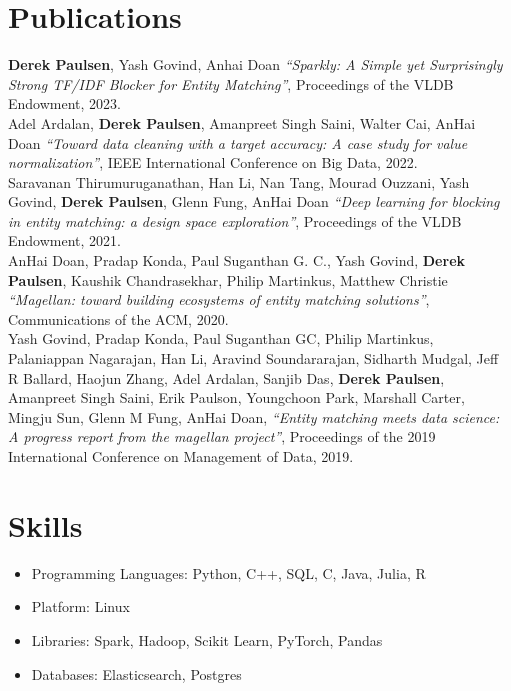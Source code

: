 \documentclass{resume}
\begin{document}
\section{\textbf{Publications}}

\textbf{Derek Paulsen}, Yash Govind, Anhai Doan
\textit{``Sparkly: A Simple yet Surprisingly Strong TF/IDF Blocker for Entity Matching''},
Proceedings of the VLDB Endowment, 2023.\\

Adel Ardalan, \textbf{Derek Paulsen}, Amanpreet Singh Saini, Walter Cai, AnHai Doan
\textit{``Toward data cleaning with a target accuracy: A case study for value normalization''},
IEEE International Conference on Big Data, 2022.\\

Saravanan Thirumuruganathan, Han Li, Nan Tang, Mourad Ouzzani, Yash Govind, \textbf{Derek Paulsen}, Glenn Fung, AnHai Doan
\textit{``Deep learning for blocking in entity matching: a design space exploration''},
Proceedings of the VLDB Endowment, 2021.\\

AnHai Doan, Pradap Konda, Paul Suganthan G. C., Yash Govind, \textbf{Derek Paulsen}, Kaushik Chandrasekhar, Philip Martinkus, Matthew Christie
\textit{``Magellan: toward building ecosystems of entity matching solutions''},
Communications of the ACM, 2020.\\

Yash Govind, Pradap Konda, Paul Suganthan GC, Philip Martinkus, Palaniappan Nagarajan, Han Li, Aravind Soundararajan, Sidharth Mudgal, Jeff R Ballard, Haojun Zhang, Adel Ardalan, Sanjib Das, \textbf{Derek Paulsen}, Amanpreet Singh Saini, Erik Paulson, Youngchoon Park, Marshall Carter, Mingju Sun, Glenn M Fung, AnHai Doan,
\textit{``Entity matching meets data science: A progress report from the magellan project''},
Proceedings of the 2019 International Conference on Management of Data, 2019.\\



\section{Skills}
\begin{itemize}[parsep=0.5ex]
	\item Programming Languages: Python, C++, SQL, C, Java, Julia, R
	\item Platform: Linux
	\item Libraries: Spark, Hadoop, Scikit Learn, PyTorch, Pandas
	\item Databases: Elasticsearch, Postgres
\end{itemize}
\end{document}
